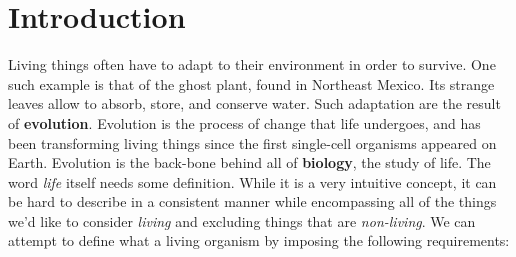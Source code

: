 \documentclass[crop=false,class=book,oneside]{standalone}
\begin{document}
    \section{Introduction}
        Living things often have to adapt to their
        environment in order to survive. One such example
        is that of the ghost plant, found in Northeast
        Mexico. Its strange leaves allow to absorb, store,
        and conserve water. Such adaptation are the
        result of \textbf{evolution}. Evolution is the
        process of change that life undergoes, and has been
        transforming living things since the first
        single-cell organisms appeared on Earth. Evolution
        is the back-bone behind all of
        \textbf{biology}, the study of life. The word
        \textit{life} itself needs some definition. While
        it is a very intuitive concept, it can be hard to
        describe in a consistent manner while encompassing
        all of the things we'd like to consider
        \textit{living} and excluding things that are
        \textit{non-living}. We can attempt to define
        what a living organism by imposing the following
        requirements:
\end{document}
